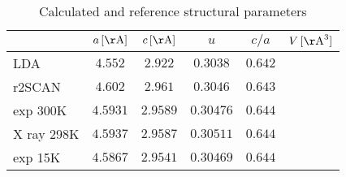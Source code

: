 \renewcommand{\arraystretch}{1.8}
\begin{table}[h]
 \caption{Calculated and reference structural parameters}
 \label{table:SpeedOfLight}
 \centering
  \begin{tabular}{lccccc}
   \hline\hline
       & $a\,[\mathrm{\AA}]$ & $c\,[\mathrm{\AA}]$ & $u$ & $c/a$ & $V\,[\mathrm{\AA}^3]$ \\
   \hline 
    LDA        & $4.552$  & $2.922$  & $0.3038$  & $0.642$   & \\
    r2SCAN     & $4.602$  & $2.961$  & $0.3046$  & $0.643$   & \\ 
    exp 300K   & $4.5931$ & $2.9589$ & $0.30476$ & $0.644$   & \\ 
    X ray 298K & $4.5937$ & $2.9587$ & $0.30511$ & $0.644$   & \\ 
    exp 15K    & $4.5867$ & $2.9541$ & $0.30469$ & $0.644$   & \\ 
    \hline
   \hline
  \end{tabular}
\end{table}
\renewcommand{\arraystretch}{1}

